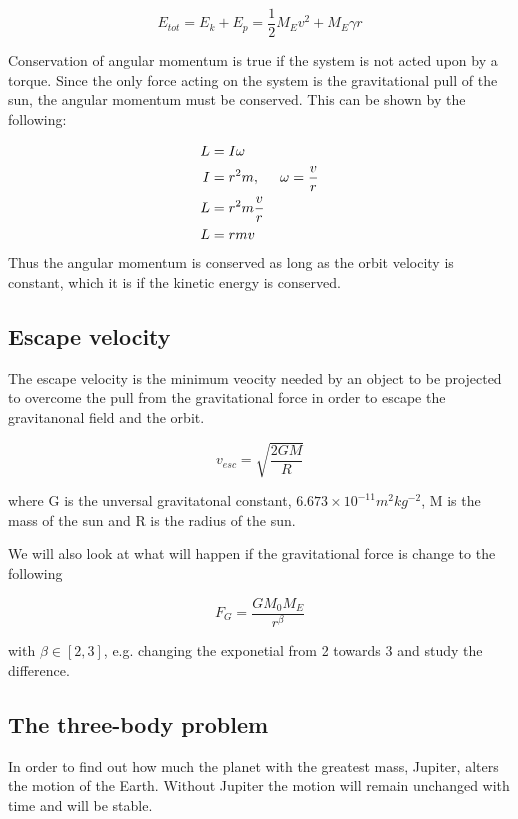 \documentclass[../main.tex]{subfiles}
\begin{document}
$$E_{tot} = E_k + E_p = \frac{1}{2} M_E v^2 + M_E \gamma r$$

Conservation of angular momentum is true if the system is not acted upon by a torque. Since the only force acting on the system is the gravitational pull of the sun, the angular momentum must be conserved. This can be shown by the following:

\begin{align*}
  L &= I \omega \\
  I &= r^2m, \hspace{5mm} \omega = \frac{v}{r} \\
  L &= r^2m \frac{v}{r} \\
  L &= rmv
\end{align*}
Thus the angular momentum is conserved as long as the orbit velocity is constant, which it is if the kinetic energy is conserved.

\subsection{Escape velocity}
The escape velocity is the minimum veocity needed by an object to be projected to overcome the pull from the gravitational force in order to escape the gravitanonal field and the orbit.

\begin{equation}\label{eq:escapevelocity}
  v_{esc} = \sqrt{\frac{2GM}{R}}
\end{equation}

where G is the unversal gravitatonal constant, $6.673\times 10^{-11} m^2kg^{-2}$, M is the mass of the sun and R is the radius of the sun.

We will also look at what will happen if the gravitational force is change to the following

$$F_G = \frac{GM_0M_E}{r^{\beta}}$$

with $\beta \in [2,3]$, e.g. changing the exponetial from 2 towards 3 and study the difference.

\subsection{The three-body problem}
In order to find out how much the planet with the greatest mass, Jupiter, alters the motion of the Earth. Without Jupiter the motion will remain unchanged with time and  will be stable.
\end{document}
